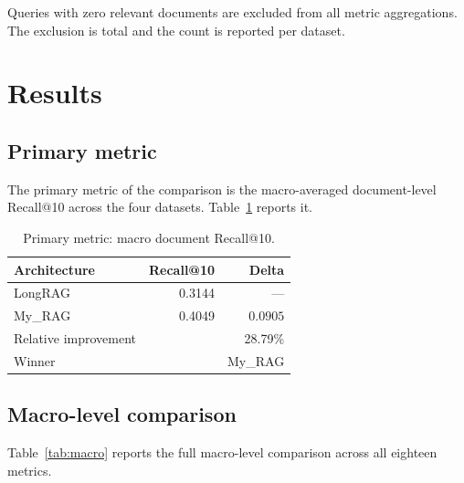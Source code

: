 \documentclass[11pt,a4paper]{article}
\begin{document}
Queries with zero relevant documents are excluded from all metric
aggregations. The exclusion is total and the count is reported per
dataset.

\section{Results}\label{sec:results}

\subsection{Primary metric}
The primary metric of the comparison is the macro-averaged
document-level Recall@10 across the four datasets.
Table~\ref{tab:primary} reports it.

\begin{table}[h]
\centering
\caption{Primary metric: macro document Recall@10.}
\label{tab:primary}
\small
\begin{tabular}{l r r}
\toprule
\textbf{Architecture} & \textbf{Recall@10} & \textbf{Delta} \\
\midrule
LongRAG              & \num{0.3144} & --- \\
My\_RAG              & \num{0.4049} & $\num{+0.0905}$ \\
\midrule
Relative improvement & & \num{28.79}\% \\
Winner & & My\_RAG \\
\bottomrule
\end{tabular}
\end{table}

\subsection{Macro-level comparison}
Table~\ref{tab:macro} reports the full macro-level comparison across
all eighteen metrics.
\end{document}
